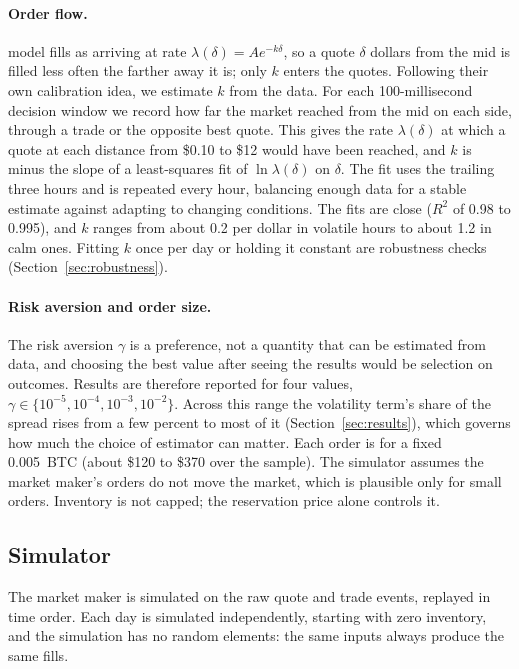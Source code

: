 \documentclass[11pt]{article}
\begin{document}
\paragraph{Order flow.}
\citet{avellaneda2008} model fills as arriving at rate $\lambda(\delta) = A e^{-k\delta}$, so a quote
$\delta$ dollars from the mid is filled less often the farther away it is; only $k$ enters the quotes.
Following their own calibration idea, we estimate $k$ from the data. For each 100-millisecond decision
window we record how far the market reached from the mid on each side, through a trade or the opposite
best quote. This gives the rate $\lambda(\delta)$ at which a quote at each distance from \$0.10 to \$12
would have been reached, and $k$ is minus the slope of a least-squares fit of $\ln\lambda(\delta)$ on
$\delta$. The fit uses the trailing three hours and is repeated every hour, balancing enough data for a
stable estimate against adapting to changing conditions. The fits are close ($R^2$ of 0.98 to 0.995), and
$k$ ranges from about 0.2 per dollar in volatile hours to about 1.2 in calm ones. Fitting $k$ once per
day or holding it constant are robustness checks (Section~\ref{sec:robustness}).

\paragraph{Risk aversion and order size.}
The risk aversion $\gamma$ is a preference, not a quantity that can be estimated from data, and choosing
the best value after seeing the results would be selection on outcomes. Results are therefore reported
for four values, $\gamma \in \{10^{-5}, 10^{-4}, 10^{-3}, 10^{-2}\}$. Across this range the volatility
term's share of the spread rises from a few percent to most of it (Section~\ref{sec:results}), which
governs how much the choice of estimator can matter. Each order is for a fixed 0.005~BTC (about \$120 to
\$370 over the sample). The simulator assumes the market maker's orders do not move the market, which is
plausible only for small orders. Inventory is not capped; the reservation price alone controls it.

\subsection{Simulator}
\label{sec:simulator}

The market maker is simulated on the raw quote and trade events, replayed in time order. Each day is
simulated independently, starting with zero inventory, and the simulation has no random elements: the
same inputs always produce the same fills.
\end{document}
